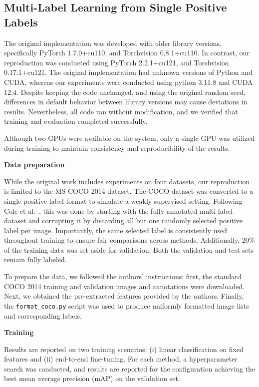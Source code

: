 \documentclass[lettersize,journal]{IEEEtran}
\renewcommand{\paragraph}[1]{%
  \vspace{1.5ex}\textbf{#1}\quad
}
\begin{document}
\subsection{Multi-Label Learning from Single Positive Labels}
The original implementation was developed with older library versions, specifically PyTorch 1.7.0+cu110, and Torchvision 0.8.1+cu110. In contrast, our reproduction was conducted using PyTorch 2.2.1+cu121, and Torchvision 0.17.1+cu121. The original implementation had unknown versions of Python and CUDA, whereas our experiments were conducted using python 3.11.8 and CUDA 12.4. Despite keeping the code unchanged, and using the original random seed, differences in default behavior between library versions may cause deviations in results. Nevertheless, all code ran without modification, and we verified that training and evaluation completed successfully.

Although two GPUs were available on the system, only a single GPU was utilized during training to maintain consistency and reproducibility of the results.

\paragraph{Data preparation}
While the original work includes experiments on four datasets, our reproduction is limited to the MS-COCO 2014 dataset. The COCO dataset was converted to a single-positive label format to simulate a weakly supervised setting. Following Cole et al.~\cite{mlsp}, this was done by starting with the fully annotated multi-label dataset and corrupting it by discarding all but one randomly selected positive label per image. Importantly, the same selected label is consistently used throughout training to ensure fair comparisons across methods. Additionally, 20\% of the training data was set aside for validation. Both the validation and test sets remain fully labeled.

To prepare the data, we followed the authors' instructions: first, the standard COCO 2014 training and validation images and annotations were downloaded. Next, we obtained the pre-extracted features provided by the authors. Finally, the \texttt{format\_coco.py} script was used to produce uniformly formatted image lists and corresponding labels.


\paragraph{Training}
Results are reported on two training scenarios: (i) linear classification on fixed features and (ii) end-to-end fine-tuning. For each method, a hyperparameter search was conducted, and results are reported for the configuration achieving the best mean average precision (mAP) on the validation set.
\end{document}
